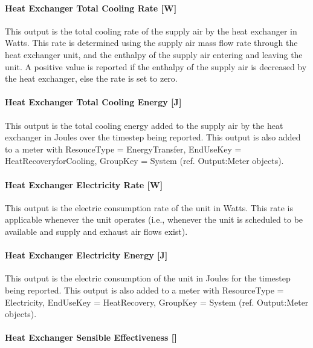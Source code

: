 \paragraph{Heat Exchanger Total Cooling Rate {[}W{]}}\label{heat-exchanger-total-cooling-rate-w-1}

This output is the total cooling rate of the supply air by the heat exchanger in Watts. This rate is determined using the supply air mass flow rate through the heat exchanger unit, and the enthalpy of the supply air entering and leaving the unit. A positive value is reported if the enthalpy of the supply air is decreased by the heat exchanger, else the rate is set to zero.

\paragraph{Heat Exchanger Total Cooling Energy {[}J{]}}\label{heat-exchanger-total-cooling-energy-j-1}

This output is the total cooling energy added to the supply air by the heat exchanger in Joules over the timestep being reported. This output is also added to a meter with ResouceType = EnergyTransfer, EndUseKey = HeatRecoveryforCooling, GroupKey = System (ref. Output:Meter objects).

\paragraph{Heat Exchanger Electricity Rate {[}W{]}}\label{heat-exchanger-electric-power-w-1}

This output is the electric consumption rate of the unit in Watts. This rate is applicable whenever the unit operates (i.e., whenever the unit is scheduled to be available and supply and exhaust air flows exist).

\paragraph{Heat Exchanger Electricity Energy {[}J{]}}\label{heat-exchanger-electric-energy-j-1}

This output is the electric consumption of the unit in Joules for the timestep being reported. This output is also added to a meter with ResourceType = Electricity, EndUseKey = HeatRecovery, GroupKey = System (ref. Output:Meter objects).

\paragraph{Heat Exchanger Sensible Effectiveness {[]}}\label{heat-exchanger-sensible-effectiveness}

